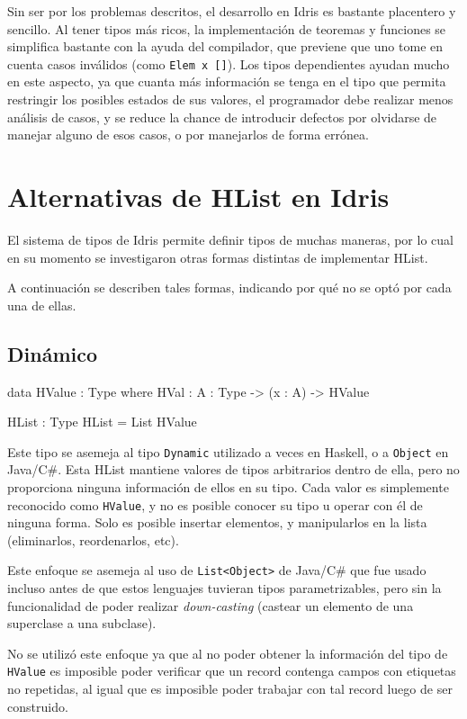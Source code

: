 Sin ser por los problemas descritos, el desarrollo en Idris es bastante placentero y sencillo. Al tener tipos más ricos, la implementación de teoremas y funciones se simplifica bastante con la ayuda del compilador, que previene que uno tome en cuenta casos inválidos (como \texttt{Elem x []}). Los tipos dependientes ayudan mucho en este aspecto, ya que cuanta más información se tenga en el tipo que permita restringir los posibles estados de sus valores, el programador debe realizar menos análisis de casos, y se reduce la chance de introducir defectos por olvidarse de manejar alguno de esos casos, o por manejarlos de forma errónea.

\section{Alternativas de HList en Idris}

El sistema de tipos de Idris permite definir tipos de muchas maneras, por lo cual en su momento se investigaron otras formas distintas de implementar HList.

A continuación se describen tales formas, indicando por qué no se optó por cada una de ellas.

\subsection{Dinámico}

\begin{code}
data HValue : Type where
  HVal : {A : Type} -> (x : A) -> HValue

HList : Type
HList = List HValue
\end{code}

Este tipo se asemeja al tipo \texttt{Dynamic} utilizado a veces en Haskell, o a \texttt{Object} en Java/C\#. Esta HList mantiene valores de tipos arbitrarios dentro de ella, pero no proporciona ninguna información de ellos en su tipo. Cada valor es simplemente reconocido como \texttt{HValue}, y no es posible conocer su tipo u operar con él de ninguna forma. Solo es posible insertar elementos, y manipularlos en la lista (eliminarlos, reordenarlos, etc).

Este enfoque se asemeja al uso de \texttt{List<Object>} de Java/C\# que fue usado incluso antes de que estos lenguajes tuvieran tipos parametrizables, pero sin la funcionalidad de poder realizar \textit{down-casting} (castear un elemento de una superclase a una subclase). 

No se utilizó este enfoque ya que al no poder obtener la información del tipo de \texttt{HValue} es imposible poder verificar que un record contenga campos con etiquetas no repetidas, al igual que es imposible poder trabajar con tal record luego de ser construido.

